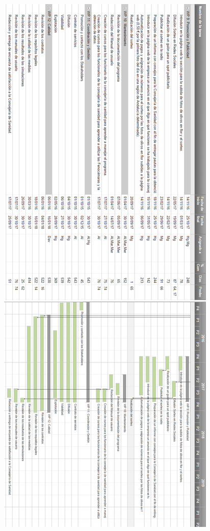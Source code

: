 \documentclass[12pt,oneside,a4paper]{article}
\numberwithin{figure}{section}
\begin{document}
\begin{figure}[H]
\begin{center}
\includegraphics[scale=.45]{Gant5.png}
\end{center}
\end{figure}
\clearpage
\end{document}
